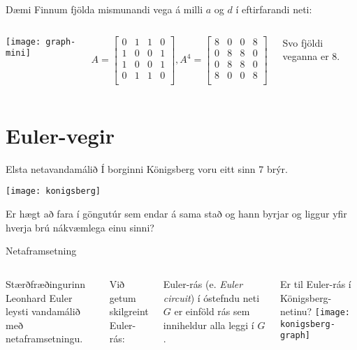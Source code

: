 \documentclass[handout]{beamer}
\begin{document}
\begin{frame}{Dæmi}
Finnum fjölda mismunandi vega á milli $a$ og $d$ í eftirfarandi neti:
\begin{columns}
\begin{center}
\texttt{[image: graph-mini]}
\end{center}
\[
A =
\begin{bmatrix}
0&1&1&0\\
1&0&0&1\\
1&0&0&1\\
0&1&1&0\\
\end{bmatrix}
,
A^4 =
\begin{bmatrix}
8&0&0&8\\
0&8&8&0\\
0&8&8&0\\
8&0&0&8\\
\end{bmatrix}
\]
\begin{center}
Svo fjöldi veganna er 8.
\end{center}
\end{columns}
\end{frame}

\section{Euler-vegir}

\begin{frame}{Elsta netavandamálið}
Í borginni Königsberg voru eitt sinn 7 brýr.
\begin{center}
\texttt{[image: konigsberg]}
\end{center}
Er hægt að fara í göngutúr sem endar á sama stað og hann byrjar og liggur yfir hverja brú nákvæmlega einu sinni?
\end{frame}

\begin{frame}{Netaframsetning}
\begin{columns}
Stærðfræðingurinn Leonhard Euler leysti vandamálið með netaframsetningu.

Við getum skilgreint Euler-rás:

\begin{tcolorbox}[title=Euler-rás]
Euler-rás (e. \emph{Euler circuit}) í óstefndu neti $G$ er einföld rás sem inniheldur alla leggi í $G$.
\end{tcolorbox}
Er til Euler-rás í Königsberg-netinu?
\texttt{[image: konigsberg-graph]}
\end{columns}
\end{frame}
\end{document}
